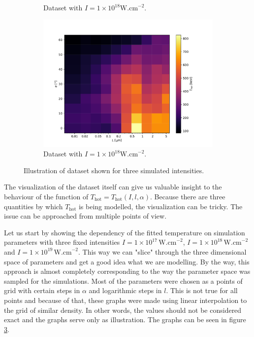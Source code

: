 \begin{figure}[ht]
\begin{subfigure}{0.49\textwidth}
		\caption{Dataset with $I = 1 \times 10^{18} \mathrm{W.cm}^{-2}$.}
		\label{fig:datset1-b}
	\end{subfigure}
	\begin{subfigure}{0.49\textwidth}
		\centering
		\includegraphics[width=\textwidth]{figures/I_1e19t_hot}
		\caption{Dataset with $I = 1 \times 10^{18} \mathrm{W.cm}^{-2}$.}
		\label{fig:dataset1-c}
	\end{subfigure}
	\caption{Illustration of dataset shown for three simulated intensities.}
	\label{fig:dataset1}
\end{figure}


The visualization of the dataset itself can give us valuable insight to the behaviour of the function of $T_{\mathrm{hot}} = T_{\mathrm{hot}}(I,l,\alpha)$. Because there are three quantities by which $T_{\mathrm{hot}}$ is being modelled, the visualization can be tricky. The issue can be approached from multiple points of view.

Let us start by showing the dependency of the fitted temperature on simulation parameters with three fixed intensities $I = 1 \times 10^{17} \,\mathrm{W.cm}^{-2}$, $I = 1 \times 10^{18} \,\mathrm{W.cm}^{-2}$ and $I = 1 \times 10^{19} \,\mathrm{W.cm}^{-2}$. This way we can "slice" through the three dimensional space of parameters and get a good idea what we are modelling. By the way, this approach is almost completely corresponding to the way the parameter space was sampled for the simulations. Most of the parameters were chosen as a points of grid with certain steps in $\alpha$ and logarithmic steps in $l$. This is not true for all points and because of that, these graphs were made using linear interpolation to the grid of similar density. In other words, the values should not be considered exact and the graphs serve only as illustration. The graphs can be seen in figure \ref{fig:dataset1}.



